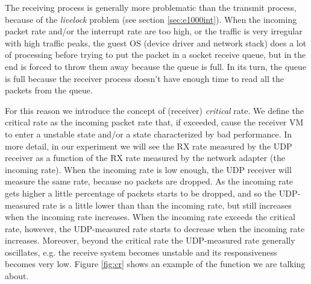 \vspace{0.5cm}

The receiving process is generally more problematic than the transmit process, because of the \emph{livelock} problem (see section 
\ref{sec:e1000int}).
When the incoming packet rate and/or the interrupt rate are too high, or the traffic is very irregular with high traffic peaks, the guest
OS (device driver and network stack) does a lot of processing before trying to put the packet in a socket receive queue, but in the end
is forced to throw them away because the queue is full. In its turn, the queue is full because the receiver process doesn't have enough
time to read all the packets from the queue.

\vspace{0.5cm}

For this reason we introduce the concept of (receiver) \emph{critical} rate. We define the critical rate as the incoming packet rate that,
if exceeded, cause the receiver VM to enter a unstable state and/or a state characterized by bad performance. In more detail, in our
experiment we will see the RX rate measured by the UDP receiver as a function of the RX rate measured by the network adapter (the incoming 
rate).
When the incoming rate is low enough, the UDP receiver will measure the same rate, because no packets are dropped. As the incoming rate gets
higher a little percentage of packets starts to be dropped, and so the UDP-measured rate is a little lower than than the incoming rate, but
still increases when the incoming rate increases. When the incoming rate exceeds the critical rate, however, the UDP-measured rate starts
to decrease when the incoming rate increases. Moreover, beyond the critical rate the UDP-measured rate generally oscillates, e.g. the
receive system becomes unstable and its responsiveness becomes very low.
Figure \ref{fig:cr} shows an example of the function we are talking about.

